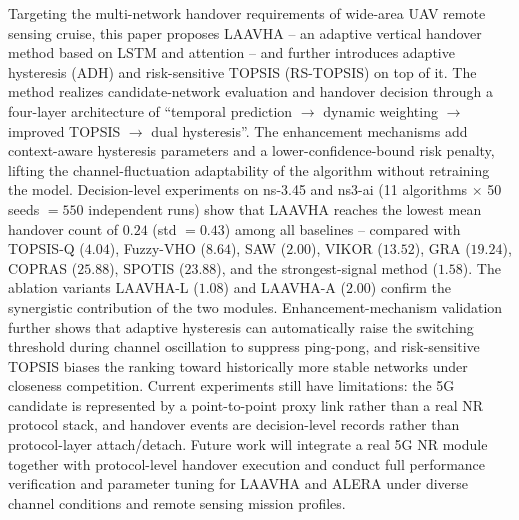 \documentclass[journal,article,submit,moreauthors]{Definitions/mdpi}
\begin{document}
Targeting the multi-network handover requirements of wide-area UAV remote sensing cruise, this paper proposes LAAVHA -- an adaptive vertical handover method based on LSTM and attention -- and further introduces adaptive hysteresis (ADH) and risk-sensitive TOPSIS (RS-TOPSIS) on top of it. The method realizes candidate-network evaluation and handover decision through a four-layer architecture of ``temporal prediction $\rightarrow$ dynamic weighting $\rightarrow$ improved TOPSIS $\rightarrow$ dual hysteresis''. The enhancement mechanisms add context-aware hysteresis parameters and a lower-confidence-bound risk penalty, lifting the channel-fluctuation adaptability of the algorithm without retraining the model. Decision-level experiments on ns-3.45 and ns3-ai (11 algorithms $\times$ 50 seeds $= 550$ independent runs) show that LAAVHA reaches the lowest mean handover count of $0.24$ (std $= 0.43$) among all baselines -- compared with TOPSIS-Q ($4.04$), Fuzzy-VHO ($8.64$), SAW ($2.00$), VIKOR ($13.52$), GRA ($19.24$), COPRAS ($25.88$), SPOTIS ($23.88$), and the strongest-signal method ($1.58$). The ablation variants LAAVHA-L ($1.08$) and LAAVHA-A ($2.00$) confirm the synergistic contribution of the two modules. Enhancement-mechanism validation further shows that adaptive hysteresis can automatically raise the switching threshold during channel oscillation to suppress ping-pong, and risk-sensitive TOPSIS biases the ranking toward historically more stable networks under closeness competition. Current experiments still have limitations: the 5G candidate is represented by a point-to-point proxy link rather than a real NR protocol stack, and handover events are decision-level records rather than protocol-layer attach/detach. Future work will integrate a real 5G NR module together with protocol-level handover execution and conduct full performance verification and parameter tuning for LAAVHA and ALERA under diverse channel conditions and remote sensing mission profiles.


\end{document}
